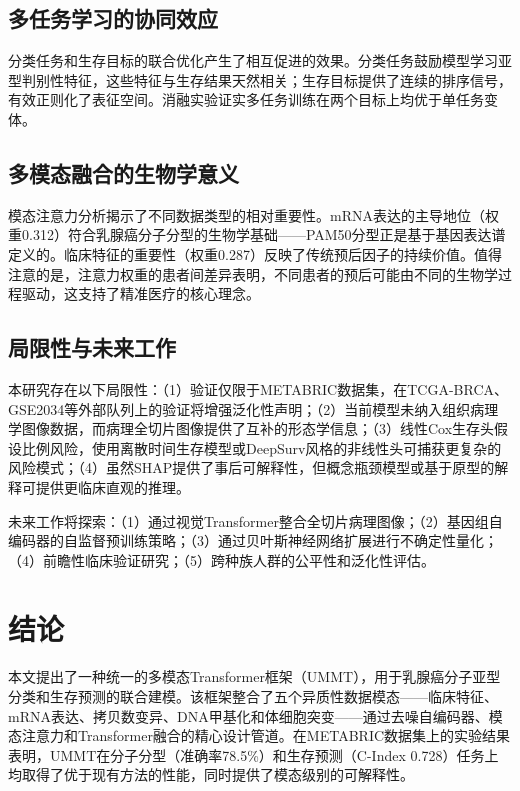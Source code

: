 \documentclass[conference]{IEEEtran}
\begin{document}
\subsection{多任务学习的协同效应}

分类任务和生存目标的联合优化产生了相互促进的效果。分类任务鼓励模型学习亚型判别性特征，这些特征与生存结果天然相关；生存目标提供了连续的排序信号，有效正则化了表征空间。消融实验证实多任务训练在两个目标上均优于单任务变体。

\subsection{多模态融合的生物学意义}

模态注意力分析揭示了不同数据类型的相对重要性。mRNA表达的主导地位（权重0.312）符合乳腺癌分子分型的生物学基础——PAM50分型正是基于基因表达谱定义的。临床特征的重要性（权重0.287）反映了传统预后因子的持续价值。值得注意的是，注意力权重的患者间差异表明，不同患者的预后可能由不同的生物学过程驱动，这支持了精准医疗的核心理念。

\subsection{局限性与未来工作}

本研究存在以下局限性：（1）验证仅限于METABRIC数据集，在TCGA-BRCA、GSE2034等外部队列上的验证将增强泛化性声明；（2）当前模型未纳入组织病理学图像数据，而病理全切片图像提供了互补的形态学信息；（3）线性Cox生存头假设比例风险，使用离散时间生存模型\cite{zadeh2020discrete}或DeepSurv风格的非线性头可捕获更复杂的风险模式；（4）虽然SHAP提供了事后可解释性，但概念瓶颈模型或基于原型的解释可提供更临床直观的推理。

未来工作将探索：（1）通过视觉Transformer整合全切片病理图像；（2）基因组自编码器的自监督预训练策略；（3）通过贝叶斯神经网络扩展进行不确定性量化；（4）前瞻性临床验证研究；（5）跨种族人群的公平性和泛化性评估。

\section{结论}
\label{sec:conclusion}

本文提出了一种统一的多模态Transformer框架（UMMT），用于乳腺癌分子亚型分类和生存预测的联合建模。该框架整合了五个异质性数据模态——临床特征、mRNA表达、拷贝数变异、DNA甲基化和体细胞突变——通过去噪自编码器、模态注意力和Transformer融合的精心设计管道。在METABRIC数据集上的实验结果表明，UMMT在分子分型（准确率78.5\%）和生存预测（C-Index 0.728）任务上均取得了优于现有方法的性能，同时提供了模态级别的可解释性。
\end{document}
